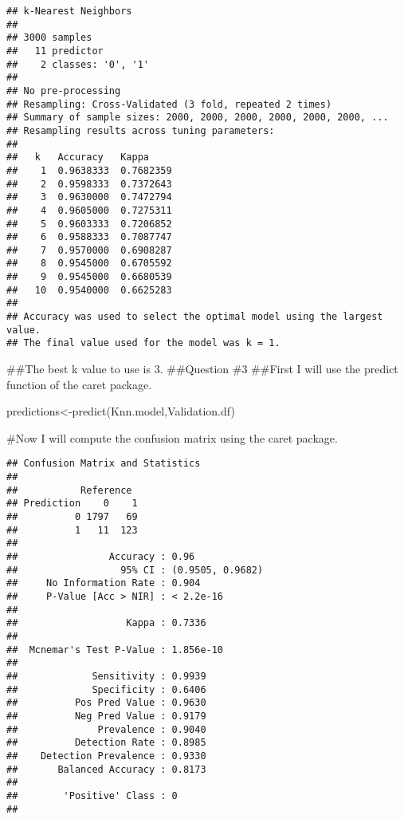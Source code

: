 \documentclass[
]{article}
\newenvironment{Shaded}{\begin{snugshade}}{\end{snugshade}}
\newcommand{\FunctionTok}[1]{\textcolor[rgb]{0.00,0.00,0.00}{#1}}
\newcommand{\NormalTok}[1]{#1}
\newcommand{\OtherTok}[1]{\textcolor[rgb]{0.56,0.35,0.01}{#1}}
\newcommand{\SpecialCharTok}[1]{\textcolor[rgb]{0.00,0.00,0.00}{#1}}
\begin{document}
\begin{verbatim}
## k-Nearest Neighbors 
## 
## 3000 samples
##   11 predictor
##    2 classes: '0', '1' 
## 
## No pre-processing
## Resampling: Cross-Validated (3 fold, repeated 2 times) 
## Summary of sample sizes: 2000, 2000, 2000, 2000, 2000, 2000, ... 
## Resampling results across tuning parameters:
## 
##   k   Accuracy   Kappa    
##    1  0.9638333  0.7682359
##    2  0.9598333  0.7372643
##    3  0.9630000  0.7472794
##    4  0.9605000  0.7275311
##    5  0.9603333  0.7206852
##    6  0.9588333  0.7087747
##    7  0.9570000  0.6908287
##    8  0.9545000  0.6705592
##    9  0.9545000  0.6680539
##   10  0.9540000  0.6625283
## 
## Accuracy was used to select the optimal model using the largest value.
## The final value used for the model was k = 1.
\end{verbatim}

\#\#The best k value to use is 3. \#\#Question \#3 \#\#First I will use
the predict function of the caret package.

\begin{Shaded}
\begin{Highlighting}[]
\NormalTok{predictions}\OtherTok{\textless{}{-}}\FunctionTok{predict}\NormalTok{(Knn.model,Validation.df)}
\end{Highlighting}
\end{Shaded}

\#Now I will compute the confusion matrix using the caret package.

\begin{Shaded}
\end{Shaded}

\begin{verbatim}
## Confusion Matrix and Statistics
## 
##           Reference
## Prediction    0    1
##          0 1797   69
##          1   11  123
##                                           
##                Accuracy : 0.96            
##                  95% CI : (0.9505, 0.9682)
##     No Information Rate : 0.904           
##     P-Value [Acc > NIR] : < 2.2e-16       
##                                           
##                   Kappa : 0.7336          
##                                           
##  Mcnemar's Test P-Value : 1.856e-10       
##                                           
##             Sensitivity : 0.9939          
##             Specificity : 0.6406          
##          Pos Pred Value : 0.9630          
##          Neg Pred Value : 0.9179          
##              Prevalence : 0.9040          
##          Detection Rate : 0.8985          
##    Detection Prevalence : 0.9330          
##       Balanced Accuracy : 0.8173          
##                                           
##        'Positive' Class : 0               
## 
\end{verbatim}
\end{document}
